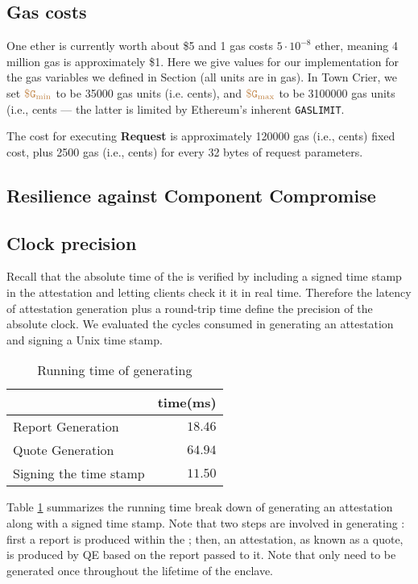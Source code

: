 \subsection{Gas costs}
One ether is currently worth about \$5 and 1 gas costs $5 \cdot 10^{-8}$ ether, meaning 4 million gas is approximately \$1.
Here we give values for our implementation for the gas variables we defined in Section  (all units are in gas).
In Town Crier, we set $\tt {\color{brown} \$G_\text{min} }$ to be 35000 gas units (i.e.   cents),
and $\tt {\color{brown} \$G_\text{max} }$ to be 3100000 gas units (i.e.,  cents --- the latter is limited by 
Ethereum's inherent {\tt GASLIMIT}.

The cost for executing {\bf Request} is approximately \num[group-separator={,}]{120000} 
gas (i.e.,  cents) 
fixed cost, 
plus \num[group-separator={,}]{2500} gas (i.e.,  cents) 
for every 32 bytes of request parameters.


\subsection{Resilience against Component Compromise}


\subsection{Clock precision}

Recall that the absolute time of the \encname is verified
by including a signed time stamp in the attestation and letting 
clients check it it in real time. Therefore the latency
of attestation generation plus a round-trip time
define the precision of the absolute clock. 
We evaluated the cycles consumed in generating an attestation and
signing a Unix time stamp.


\begin{table}[ht]
\centering
\begin{tabular}{lr}
\toprule
  & time(ms) \\
\midrule
Report Generation & $18.46$ \\
Quote Generation & $64.94$ \\
Signing the time stamp & $11.50$ \\
\bottomrule
\end{tabular}
\caption{Running time of generating \att}
\label{tab:eval_att}
\end{table}

Table \ref{tab:eval_att} summarizes the running time break down of generating an
attestation along with a signed time stamp.  Note that two steps are involved in
generating \att: first a report is produced within the \encname; then, an
attestation, as known as a quote, is produced by QE based on the report passed
to it. Note that \att only need to be generated once throughout the lifetime of the
enclave.



